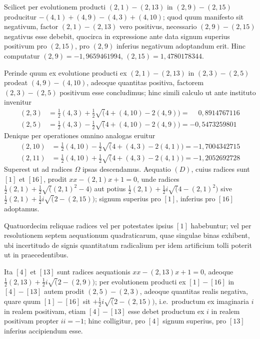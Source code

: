\documentclass[12pt,a4paper]{article}
\theoremstyle{plain}
\theoremstyle{definition}
\theoremstyle{remark}
\begin{document}
Scilicet per evolutionem producti $(2,1)-(2,13)$ in $(2,9)-(2,15)$ producitur $-(4,1)+(4,9)-(4,3)+(4,10)$; quod quum manifesto sit negativum, factor $(2,1)-(2,13)$ vero positivus, necessario $(2,9)-(2,15)$ negativus esse debebit, quocirca in expressione ante data signum superius positivum pro $(2,15)$, pro $(2,9)$ inferius negativum adoptandum erit. Hinc computatur $(2,9)=-1{,}9659461994$, $(2,15)=1{,}4780178344$.

Perinde quum ex evolutione producti ex $(2,1)-(2,13)$ in $(2,3)-(2,5)$ prodeat $(4,9)-(4,10)$, adeoque quantitas positiva, factorem $(2,3)-(2,5)$ positivum esse concludimus; hinc simili calculo ut ante instituto invenitur
\begin{align*}
(2,3)&=\tfrac{1}{2}(4,3)+\tfrac{1}{2}\surd(4+(4,10)-2(4,9))=\phantom{-}0{,}8914767116\\
(2,5)&=\tfrac{1}{2}(4,3)-\tfrac{1}{2}\surd(4+(4,10)-2(4,9))=-0{,}5473259801
\end{align*}
Denique per operationes omnino analogas eruitur
\begin{align*}
(2,10)&=\tfrac{1}{2}(4,10)-\tfrac{1}{2}\surd(4+(4,3)-2(4,1))=-1{,}7004342715\\
(2,11)&=\tfrac{1}{2}(4,10)+\tfrac{1}{2}\surd(4+(4,3)-2(4,1))=-1{,}2052692728
\end{align*}
Superest ut ad radices $\Omega$ ipsas descendamus. Aequatio $(D)$, cuius radices sunt $[1]$ et $[16]$, prodit $xx-(2,1)x+1=0$, unde radices $\frac{1}{2}(2,1)+\frac{1}{2}\surd((2,1)^2-4)$ aut potius $\frac{1}{2}(2,1)+\frac{1}{2}i\surd(4-(2,1)^2)$ sive $\frac{1}{2}(2,1)+\frac{1}{2}i\surd(2-(2,15))$; signum superius pro $[1]$, inferius pro $[16]$ adoptamus.

Quatuordecim reliquae radices vel per potestates ipsius $[1]$ habebuntur; vel per resolutionem septem aequationum quadraticarum, quae singulae binas exhibent, ubi incertitudo de signis quantitatum radicalium per idem artificium tolli poterit ut in praecedentibus.

Ita $[4]$ et $[13]$ sunt radices aequationis $xx-(2,13)x+1=0$, adeoque $\frac{1}{2}(2,13)+\frac{1}{2}i\surd(2-(2,9))$; per evolutionem producti ex $[1]-[16]$ in $[4]-[13]$ autem prodit $(2,5)-(2,3)$, adeoque quantitas realis negativa, quare quum $[1]-[16]$ sit $+\frac{1}{2}i\surd(2-(2,15))$, i.e.\ productum ex imaginaria $i$ in realem positivam, etiam $[4]-[13]$ esse debet productum ex $i$ in realem positivam propter $ii=-1$; hinc colligitur, pro $[4]$ signum superius, pro $[13]$ inferius accipiendum esse.
\end{document}
